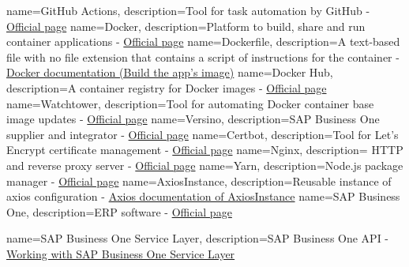 {
        name=GitHub Actions,
        description={Tool for task automation by GitHub - \href{https://github.com/features/actions}{Official page}}
}
{
        name=Docker,
        description={Platform to build, share and run container applications - \href{https://www.docker.com}{Official page}}
}
{
        name=Dockerfile,
        description={A text-based file with no file extension that contains a script of instructions for the container - \href{https://docs.docker.com/get-started/02_our_app/#build-the-apps-image}{Docker documentation (Build the app's image)}}
}
{
        name=Docker Hub,
        description={A container registry for Docker images - \href{https://hub.docker.com}{Official page}}
}
{
        name=Watchtower,
        description={Tool for automating Docker container base image updates - \href{https://containrrr.dev/watchtower/}{Official page}}
}
{
        name=Versino,
        description={SAP Business One supplier and integrator -  \href{https://www.versino.cz/cs-cz/}{Official page}}
}
{
        name=Certbot,
        description={Tool for Let's Encrypt certificate management -  \href{https://certbot.eff.org}{Official page}}
}
{
        name=Nginx,
        description={ HTTP and reverse proxy server -  \href{https://www.nginx.com}{Official page}}
}
{
        name=Yarn,
        description={Node.js package manager -  \href{https://www.yarnpkg.com}{Official page}}
}
{
        name=AxiosInstance,
        description={Reusable instance of axios configuration -  \href{https://axios-http.com/docs/instance}{Axios documentation of AxiosInstance}}
}
{
        name=SAP Business One,
        description={ERP software -  \href{https://www.sap.com/products/erp/business-one.html}{Official page}}
}

{
        name=SAP Business One Service Layer,
        description={SAP Business One API -  \href{https://help.sap.com/doc/0d2533ad95ba4ad7a702e83570a21c32/9.3/en-US/Working_with_SAP_Business_One_Service_Layer.pdf}{Working with SAP Business One Service Layer}}
}

